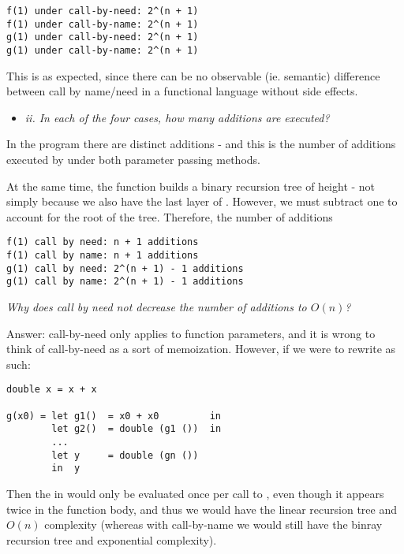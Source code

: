 \begin{verbatim}
f(1) under call-by-need: 2^(n + 1)
f(1) under call-by-name: 2^(n + 1)
g(1) under call-by-need: 2^(n + 1)
g(1) under call-by-name: 2^(n + 1)
\end{verbatim}

This is as expected, since there can be no observable (ie. semantic) difference
between call by name/need in a functional language without side effects.

\newpage
\begin{itemize}
  \item \textit{ii. In each of the four cases, how many additions are executed?}
\end{itemize}

In the program there are  distinct additions - and this is the
number of additions executed by  under both parameter passing methods.

\medskip

At the same time, the function  builds a binary recursion tree of height
 - not simply  because we also have the last layer of . However, we must subtract one to account for the root of the tree.
Therefore, the number of additions

\begin{verbatim}
f(1) call by need: n + 1 additions
f(1) call by name: n + 1 additions
g(1) call by need: 2^(n + 1) - 1 additions
g(1) call by name: 2^(n + 1) - 1 additions
\end{verbatim}

\emph{Why does call by need not decrease the number of additions to $O(n)$?}

\smallskip

Answer: call-by-need only applies to function parameters, and it is wrong to
think of call-by-need as a sort of memoization. However, if we were to rewrite
 as such:

\begin{verbatim}
double x = x + x

g(x0) = let g1()  = x0 + x0         in
        let g2()  = double (g1 ())  in
        ...
        let y     = double (gn ())
        in  y
\end{verbatim}

Then the  in  would only be evaluated once per call to
, even though it appears twice in the function body, and thus we
would have the linear recursion tree and $O(n)$ complexity (whereas with
call-by-name we would still have the binray recursion tree and exponential
complexity).

\Sectend
